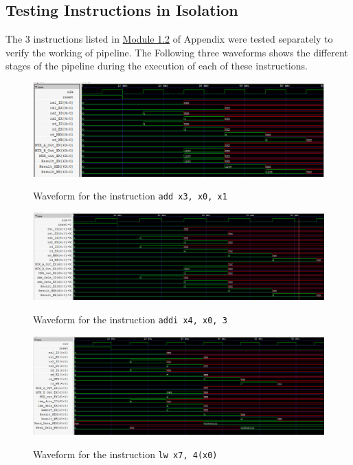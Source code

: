 \documentclass[12pt]{article}
\begin{document}
\subsection*{\Large Testing Instructions in Isolation}
The 3 instructions listed in \hyperref[iso]{Module 1.2} of Appendix were tested separately to verify the working of pipeline. The Following three waveforms shows the different stages of the pipeline during the execution of each of these instructions.
\begin{figure}[H]
    \centering
    \includegraphics[scale = 0.6]{../images/Test 1.PNG}
    \label{img4}
    \caption{Waveform for the instruction \texttt{add x3, x0, x1}}
\end{figure}
\begin{figure}[H]
    \centering
    \includegraphics[scale = 0.5]{../images/Test 2.PNG}
    \label{img5}
    \caption{Waveform for the instruction \texttt{addi x4, x0, 3}}
\end{figure}
\begin{figure}[H]
    \centering
    \includegraphics[scale = 0.51]{../images/Test 3.PNG}
    \label{img6}
    \caption{Waveform for the instruction \texttt{lw x7, 4(x0)}}
\end{figure}
\pagebreak
\end{document}
